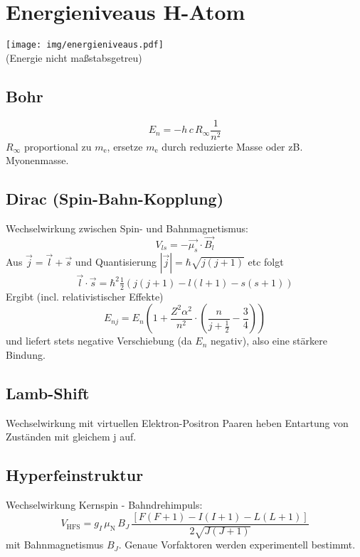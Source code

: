 \section{Energieniveaus H-Atom}
\begin{center}
	\texttt{[image: img/energieniveaus.pdf]}\\
	(Energie nicht maßstabsgetreu)
\end{center}

\subsection{Bohr}
\begin{equation*}
	E_n = -h \, c \, R_\infty \frac{1}{n^2}
\end{equation*}
$R_\infty$ proportional zu $m_\text{e}$, ersetze $m_\text{e}$ durch reduzierte Masse oder zB. Myonenmasse.

\subsection{Dirac (Spin-Bahn-Kopplung)}
Wechselwirkung zwischen Spin- und Bahnmagnetismus:
\begin{equation*}
	V_{ls} = -\vec{\mu_s} \cdot \vec{B_l}
\end{equation*}
Aus $\vec{j} = \vec{l} + \vec{s}$ und Quantisierung $|\vec{j}| = \hbar \sqrt{j(j+1)}$ etc folgt
\begin{equation*}
	\vec{l} \cdot \vec{s} = \hbar^2 \tfrac{1}{2}\left(j(j+1)-l(l+1)-s(s+1)\right)
\end{equation*}
Ergibt (incl. relativistischer Effekte)
\begin{equation*}
	E_{nj} = E_n \left(1 + \frac{Z^2 \alpha^2}{n^2} \cdot \left(\frac{n}{j+\frac{1}{2}} - \frac{3}{4} \right)\right)
\end{equation*}
und liefert stets negative Verschiebung (da $E_n$ negativ), also eine stärkere Bindung.

\subsection{Lamb-Shift}
Wechselwirkung mit virtuellen Elektron-Positron Paaren heben Entartung von Zuständen mit gleichem j auf.

\subsection{Hyperfeinstruktur}
Wechselwirkung Kernspin - Bahndrehimpuls:
\begin{equation*}
	V_\text{HFS} = g_I \, \mu_\text{N} \, B_J \, \frac{\left[F(F+1)-I(I+1)-L(L+1)\right]}{2 \sqrt{J(J+1)}}
\end{equation*}
mit Bahnmagnetismus $B_J$.
Genaue Vorfaktoren werden experimentell bestimmt.
